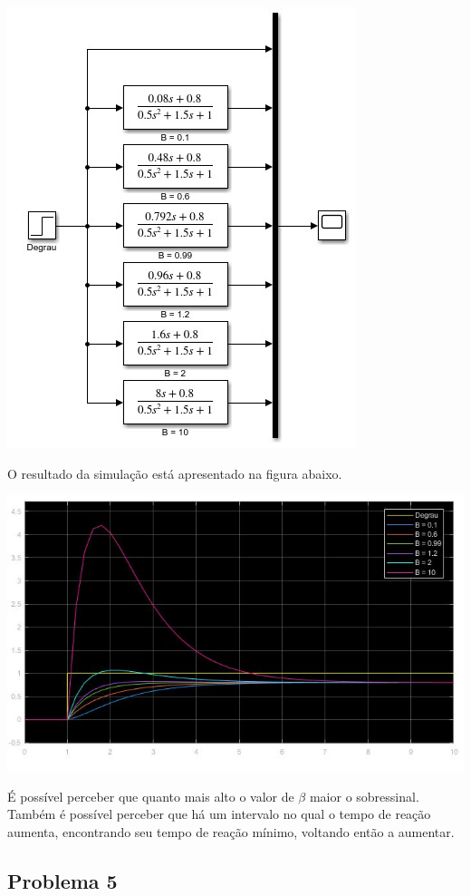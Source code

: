 \documentclass[
]{book}
\begin{document}
\includegraphics{Imagens/Lab2/modelSim4.jpg}

O resultado da simulação está apresentado na figura abaixo.

\includegraphics{Imagens/Lab2/prob4SimResult.jpg}

É possível perceber que quanto mais alto o valor de \(\beta\) maior o sobressinal. Também é possível perceber que há um intervalo no qual o tempo de reação aumenta, encontrando seu tempo de reação mínimo, voltando então a aumentar.

\hypertarget{problema-5}{%
\subsection*{Problema 5}\label{problema-5}}
\end{document}
